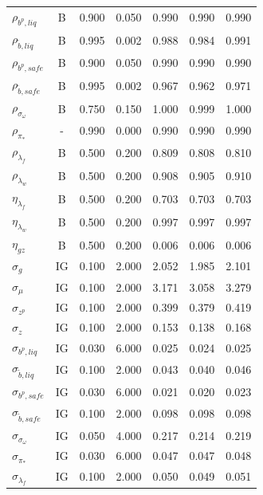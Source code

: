\documentclass[12pt]{article}
\begin{document}
{\begin{longtable}{lcccccc}
$\rho_{b^p, liq}$ & B &    0.900 &    0.050 &    0.990 &    0.990 &    0.990 \\
$\rho_{\tilde{b}, liq}$ & B &    0.995 &    0.002 &    0.988 &    0.984 &    0.991 \\
$\rho_{b^p, safe}$ & B &    0.900 &    0.050 &    0.990 &    0.990 &    0.990 \\
$\rho_{\tilde{b}, safe}$ & B &    0.995 &    0.002 &    0.967 &    0.962 &    0.971 \\
$\rho_{\sigma_\omega}$ & B &    0.750 &    0.150 &    1.000 &    0.999 &    1.000 \\
$\rho_{\pi_*}$ & - &    0.990 &    0.000 &    0.990 &    0.990 &    0.990 \\
$\rho_{\lambda_f}$ & B &    0.500 &    0.200 &    0.809 &    0.808 &    0.810 \\
$\rho_{\lambda_w}$ & B &    0.500 &    0.200 &    0.908 &    0.905 &    0.910 \\
$\eta_{\lambda_f}$ & B &    0.500 &    0.200 &    0.703 &    0.703 &    0.703 \\
$\eta_{\lambda_w}$ & B &    0.500 &    0.200 &    0.997 &    0.997 &    0.997 \\
$\eta_{gz}$ & B &    0.500 &    0.200 &    0.006 &    0.006 &    0.006 \\
$\sigma_{g}$ & IG &    0.100 &    2.000 &    2.052 &    1.985 &    2.101 \\
$\sigma_{\mu}$ & IG &    0.100 &    2.000 &    3.171 &    3.058 &    3.279 \\
$\sigma_{z^p}$ & IG &    0.100 &    2.000 &    0.399 &    0.379 &    0.419 \\
$\sigma_{z}$ & IG &    0.100 &    2.000 &    0.153 &    0.138 &    0.168 \\
$\sigma_{b^p, liq}$ & IG &    0.030 &    6.000 &    0.025 &    0.024 &    0.025 \\
$\sigma_{\tilde{b}, liq}$ & IG &    0.100 &    2.000 &    0.043 &    0.040 &    0.046 \\
$\sigma_{b^p, safe}$ & IG &    0.030 &    6.000 &    0.021 &    0.020 &    0.023 \\
$\sigma_{\tilde{b}, safe}$ & IG &    0.100 &    2.000 &    0.098 &    0.098 &    0.098 \\
$\sigma_{\sigma_\omega}$ & IG &    0.050 &    4.000 &    0.217 &    0.214 &    0.219 \\
$\sigma_{\pi_*}$ & IG &    0.030 &    6.000 &    0.047 &    0.047 &    0.048 \\
$\sigma_{\lambda_f}$ & IG &    0.100 &    2.000 &    0.050 &    0.049 &    0.051 \\

\end{longtable}}
\end{document}
